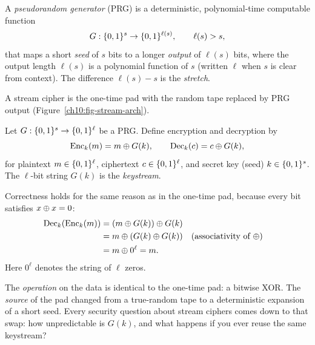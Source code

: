 \begin{definition}
\label{ch10:def-prg}
A \emph{pseudorandom generator} (PRG) is a deterministic, polynomial-time computable function
\[
  G : \{0,1\}^{s} \to \{0,1\}^{\ell(s)}, \qquad \ell(s) > s,
\]
that maps a short \emph{seed} of $s$ bits to a longer \emph{output} of $\ell(s)$ bits, where the output length $\ell(s)$ is a polynomial function of $s$ (written $\ell$ when $s$ is clear from context). The difference $\ell(s) - s$ is the \emph{stretch}.
\end{definition}

A stream cipher is the one-time pad with the random tape replaced by PRG output (Figure~\ref{ch10:fig-stream-arch}).

\begin{definition}
\label{ch10:def-stream}
Let $G:\{0,1\}^s \to \{0,1\}^{\ell}$ be a PRG. Define encryption and decryption by
\[
  \operatorname{Enc}_k(m) = m \oplus G(k), \qquad \operatorname{Dec}_k(c) = c \oplus G(k),
\]
for plaintext $m \in \{0,1\}^{\ell}$, ciphertext $c \in \{0,1\}^{\ell}$, and secret key (seed) $k \in \{0,1\}^s$. The $\ell$-bit string $G(k)$ is the \emph{keystream}.
\end{definition}

Correctness holds for the same reason as in the one-time pad, because every bit satisfies $x \oplus x = 0$:
\begin{align*}
  \operatorname{Dec}_k(\operatorname{Enc}_k(m))
  &= (m \oplus G(k)) \oplus G(k) \\
  &= m \oplus (G(k) \oplus G(k)) && \text{(associativity of $\oplus$)} \\
  &= m \oplus 0^\ell = m.
\end{align*}
Here $0^\ell$ denotes the string of $\ell$ zeros.

\begin{focusbox}
The \emph{operation} on the data is identical to the one-time pad: a bitwise XOR. The \emph{source} of the pad changed from a true-random tape to a deterministic expansion of a short seed. Every security question about stream ciphers comes down to that swap: how unpredictable is $G(k)$, and what happens if you ever reuse the same keystream?
\end{focusbox}

